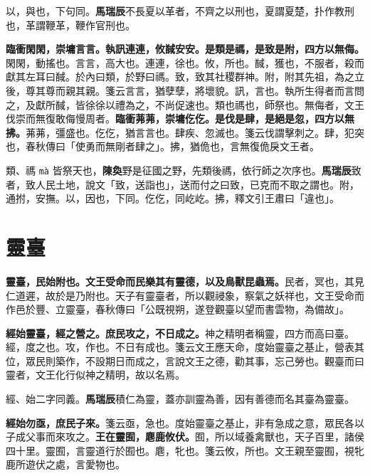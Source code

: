 \begin{quoting}以，與也，下句同。\textbf{馬瑞辰}不長夏以革者，不齊之以刑也，夏謂夏楚，扑作教刑也，革謂鞭革，鞭作官刑也。\end{quoting}

\textbf{臨衝閑閑，崇墉言言。執訊連連，攸馘安安。是類是禡，是致是附，四方以無侮。}{\footnotesize 閑閑，動搖也。言言，高大也。連連，徐也。攸，所也。馘，獲也，不服者，殺而獻其左耳曰馘。於內曰類，於野曰禡。致，致其社稷群神。附，附其先祖，為之立後，尊其尊而親其親。箋云言言，猶孽孽，將壞貌。訊，言也。執所生得者而言問之，及獻所馘，皆徐徐以禮為之，不尚促速也。類也禡也，師祭也。無侮者，文王伐崇而無復敢侮慢周者。}\textbf{臨衝茀茀，崇墉仡仡。是伐是肆，是絕是忽，四方以無拂。}{\footnotesize 茀茀，彊盛也。仡仡，猶言言也。肆疾、忽滅也。箋云伐謂擊刺之。肆，犯突也，春秋傳曰「使勇而無剛者肆之」。拂，猶佹也，言無復佹戾文王者。}

\begin{quoting}類、禡 \texttt{mà} 皆祭天也，\textbf{陳奐}野是征國之野，先類後禡，依行師之次序也。\textbf{馬瑞辰}致者，致人民土地，說文「致，送詣也」，送而付之曰致，已克而不取之謂也。附，通拊，安撫。以，因也，下同。仡仡，同屹屹。拂，釋文引王肅曰「違也」。\end{quoting}

\section{靈臺}


\textbf{靈臺，民始附也。文王受命而民樂其有靈德，以及鳥獸昆蟲焉。}{\footnotesize 民者，冥也，其見仁道遲，故於是乃附也。天子有靈臺者，所以觀祲象，察氣之妖祥也，文王受命而作邑於豐、立靈臺，春秋傳曰「公既視朔，遂登觀臺以望而書雲物，為備故」。}

\textbf{經始靈臺，經之營之。庶民攻之，不日成之。}{\footnotesize 神之精明者稱靈，四方而高曰臺。經，度之也。攻，作也。不日有成也。箋云文王應天命，度始靈臺之基止，營表其位，眾民則築作，不設期日而成之，言說文王之德，勸其事，忘己勞也。觀臺而曰靈者，文王化行似神之精明，故以名焉。}

\begin{quoting}經、始二字同義。\textbf{馬瑞辰}積仁為靈，蓋亦訓靈為善，因有善德而名其臺為靈臺。\end{quoting}

\textbf{經始勿亟，庶民子來。}{\footnotesize 箋云亟，急也。度始靈臺之基止，非有急成之意，眾民各以子成父事而來攻之。}\textbf{王在靈囿，麀鹿攸伏。}{\footnotesize 囿，所以域養禽獸也，天子百里，諸侯四十里。靈囿，言靈道行於囿也。麀，牝也。箋云攸，所也。文王親至靈囿，視牝鹿所遊伏之處，言愛物也。}

